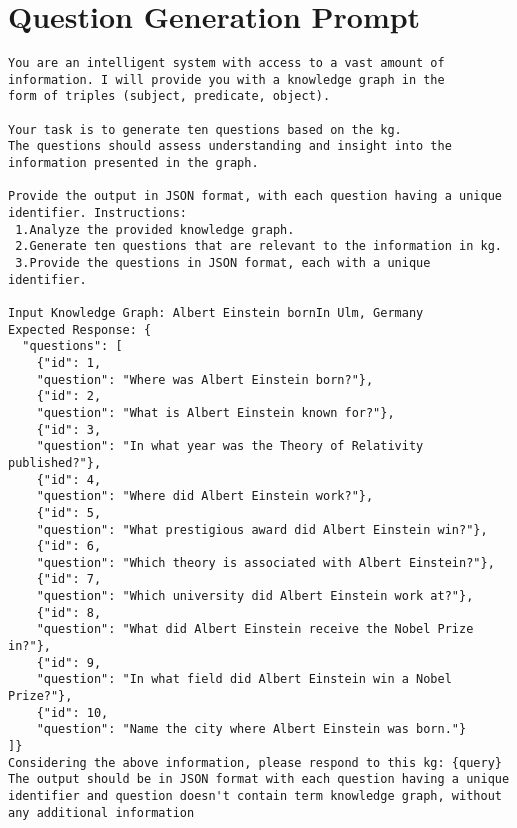 \section{Question Generation Prompt}\label{sec:prompt-templates:10-question}
\begin{Verbatim}[fontsize=\small, frame=single, label={Prompt template for generating 10 questions for each triple}]
You are an intelligent system with access to a vast amount of
information. I will provide you with a knowledge graph in the
form of triples (subject, predicate, object).

Your task is to generate ten questions based on the kg.
The questions should assess understanding and insight into the
information presented in the graph.

Provide the output in JSON format, with each question having a unique
identifier. Instructions:
 1.Analyze the provided knowledge graph.
 2.Generate ten questions that are relevant to the information in kg.
 3.Provide the questions in JSON format, each with a unique identifier.

Input Knowledge Graph: Albert Einstein bornIn Ulm, Germany
Expected Response: {
  "questions": [
    {"id": 1,
    "question": "Where was Albert Einstein born?"},
    {"id": 2,
    "question": "What is Albert Einstein known for?"},
    {"id": 3,
    "question": "In what year was the Theory of Relativity published?"},
    {"id": 4,
    "question": "Where did Albert Einstein work?"},
    {"id": 5,
    "question": "What prestigious award did Albert Einstein win?"},
    {"id": 6,
    "question": "Which theory is associated with Albert Einstein?"},
    {"id": 7,
    "question": "Which university did Albert Einstein work at?"},
    {"id": 8,
    "question": "What did Albert Einstein receive the Nobel Prize in?"},
    {"id": 9,
    "question": "In what field did Albert Einstein win a Nobel Prize?"},
    {"id": 10,
    "question": "Name the city where Albert Einstein was born."}
]}
Considering the above information, please respond to this kg: {query}
The output should be in JSON format with each question having a unique
identifier and question doesn't contain term knowledge graph, without
any additional information
\end{Verbatim}